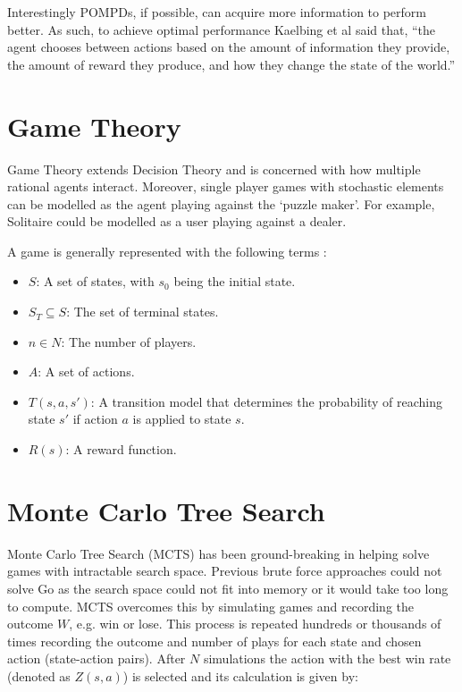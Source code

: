 \documentclass{bhamthesis}
\theoremstyle{definition}
\begin{document}
Interestingly POMPDs, if possible, can acquire more information to perform better. As such, to achieve optimal performance Kaelbing et al \cite{Kaelbling1998} said that, ``the agent chooses between actions based on the amount of information they provide, the amount of reward they produce, and how they change the state of the world.''

\section{Game Theory}
Game Theory extends Decision Theory and is concerned with how multiple rational agents interact. Moreover, single player games with stochastic elements can be modelled as the agent playing against the `puzzle maker'. For example, Solitaire could be modelled as a user playing against a dealer.

A game is generally represented with the following terms \cite{Browne2012}:

\begin{itemize}
	\item $S$: A set of states, with $s_0$ being the initial state.
	\item $S_T \subseteq S$: The set of terminal states.
	\item $n \in N$: The number of players.
	\item $A$: A set of actions.
	\item $T(s,a,s')$: A transition model that determines the probability of reaching state $s'$ if action $a$ is applied to state $s$.
	\item $R(s)$: A reward function.
\end{itemize}



\section{Monte Carlo Tree Search}\label{s:mcts}
Monte Carlo Tree Search (MCTS) has been ground-breaking in helping solve games with intractable search space. Previous brute force approaches could not solve Go as the search space could not fit into memory or it would take too long to compute. MCTS overcomes this by simulating games and recording the outcome $W$, e.g. win or lose. This process is repeated hundreds or thousands of times recording the outcome and number of plays for each state and chosen action (state-action pairs). After $N$ simulations the action with the best win rate (denoted as $Z(s,a)$) is selected and its calculation is given by:
\end{document}
